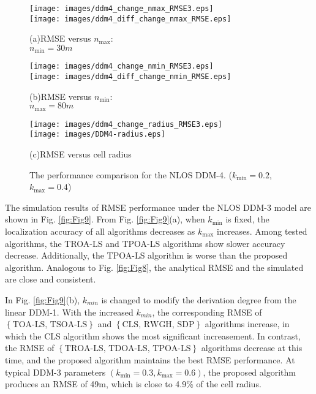 \documentclass[journal]{IEEEtran}
\begin{document}
\begin{figure*}[htb!]
   \centering
   \begin{minipage}[b]{0.3\linewidth}
      \centering
      \texttt{[image: images/ddm4\_change\_nmax\_RMSE3.eps]}\\
      \texttt{[image: images/ddm4\_diff\_change\_nmax\_RMSE.eps]}
      \caption*{
         (a)\quad RMSE versus ${n_{\max}}$:\\ ${n_{\min} = 30m}$
      }
      \label{Fig10:(a)}
   \end{minipage}
      \qquad
      \begin{minipage}[b]{0.3\linewidth}
         \centering
         \texttt{[image: images/ddm4\_change\_nmin\_RMSE3.eps]}\\
         \texttt{[image: images/ddm4\_diff\_change\_nmin\_RMSE.eps]}
         \caption*{(b)\quad RMSE versus ${n_{\min}}$:\\ ${n_{\max} =80m}$}
         \label{Fig10:(b)}
      \end{minipage}
         \qquad
         \begin{minipage}[b]{0.3\linewidth}
            \centering
            \texttt{[image: images/ddm4\_change\_radius\_RMSE3.eps]}\\
            \texttt{[image: images/DDM4-radius.eps]}
            \caption*{(c)\quad RMSE versus cell radius}
            \label{Fig10:(c)}
         \end{minipage}
         \caption{The performance comparison for the NLOS DDM-4. (${{k_{\min}} =0.2}$, ${k_{\max} =0.4}$)}
         \label{fig:Fig10}
\end{figure*}

The simulation results of RMSE performance under the NLOS DDM-3 model are shown in Fig. \ref{fig:Fig9}. From Fig. \ref{fig:Fig9}(a), when ${k_{\min}}$ is fixed, the localization accuracy of all algorithms decreases as ${k_{\max}}$ increases. Among tested algorithms, the TROA-LS and TPOA-LS algorithms show slower accuracy decrease. Additionally, the TPOA-LS algorithm is worse than the proposed algorithm. Analogous to Fig. \ref{fig:Fig8}, the analytical RMSE and the simulated are close and consistent.

In Fig. \ref{fig:Fig9}(b), ${k_{min}}$ is changed to modify the derivation degree from the linear DDM-1. With the increased ${k_{min}}$, the corresponding RMSE of $\left\{\text{TOA-LS, TSOA-LS}\right\}$ and $\left\{\text{CLS, RWGH, SDP}\right\}$ algorithms increase, in which the CLS algorithm shows the most significant increasement. In contrast, the RMSE of $\left\{\text{TROA-LS, TDOA-LS, TPOA-LS}\right\}$ algorithms decrease at this time, and the proposed algorithm maintains the best RMSE performance. At typical DDM-3 parameters $\left({k_{\min}} = 0.3, {k_{\max}} = 0.6\right)$, the proposed algorithm produces an RMSE of 49m, which is close to 4.9\% of the cell radius.
\end{document}
